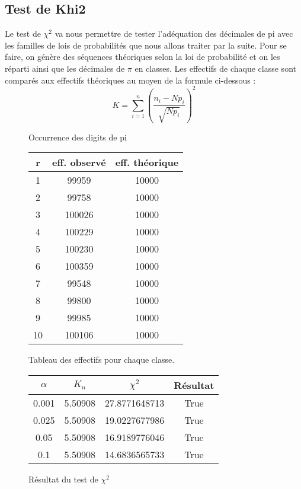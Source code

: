 \documentclass[a4paper,10pt]{article}
\begin{document}
\subsection{Test de Khi2}
Le test de $\chi^2$ va nous permettre de tester l'adéquation des décimales de pi avec les familles de lois de probabilités que nous allons traiter par la suite. Pour se faire, on génère des séquences théoriques selon la loi de probabilité et on les réparti ainsi que les décimales de $\pi$ en classes. Les effectifs de chaque classe sont comparés aux effectifs théoriques au moyen de la formule ci-dessous :
\[ K = \displaystyle\sum_{i=1}^n (\frac{n_i-Np_i}{\sqrt{Np_i}})^2\]
\begin{figure}[h!]
\caption{Occurrence des digits de pi}
\label{khi2histo}
\end{figure}

\begin{figure}[h!]
\begin{center}
\begin{tabular}{|c|c|c|}
\hline
r & eff. observé & eff. théorique \\
\hline
1 & 99959 & 10000\\
2 & 99758 & 10000\\
3 & 100026 & 10000\\
4 & 100229 & 10000\\
5 & 100230 & 10000\\
6 & 100359 & 10000\\
7 & 99548 & 10000\\
8 & 99800 & 10000\\
9 & 99985 & 10000\\
10 & 100106 & 10000\\
\hline
\end{tabular}
\end{center}
\caption{Tableau des effectifs pour chaque classe.}
\end{figure}

\begin{figure}[h!]
\begin{center}
\begin{tabular}{|c|c|c|c|}
\hline
$\alpha$ & $K_n$ & $\chi^2$ & Résultat\\
\hline
0.001 & 5.50908 & 27.8771648713 & True\\
0.025 & 5.50908 & 19.0227677986 & True\\
0.05 & 5.50908 & 16.9189776046 & True\\
0.1 & 5.50908 & 14.6836565733 & True\\
\hline
\end{tabular}
\end{center}
\caption{Résultat du test de $\chi^2$}
\end{figure}
\end{document}
